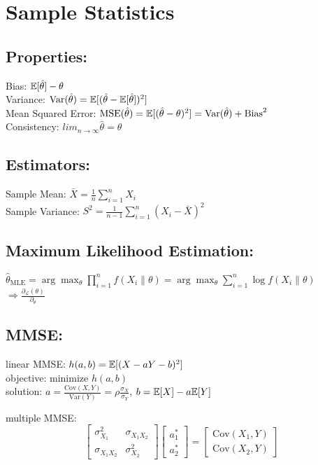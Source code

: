 \section{Sample Statistics}
\subsection{Properties:}
Bias: $\mathbb{E}[\hat{\theta}] - \theta$\\
Variance: $\text{Var}(\hat{\theta}) = \mathbb{E}[(\hat{\theta} - \mathbb{E}[\hat{\theta}])^2]$\\
Mean Squared Error: $\text{MSE}(\hat{\theta}) = \mathbb{E}[(\hat{\theta} - \theta)^2] = 
\text{Var}(\hat{\theta}) + \text{Bias}^2$\\
Consistency: $lim_{n \to \infty} \hat{\theta} = \theta$\\
\subsection{Estimators:}
Sample Mean: $\bar{X} = \frac{1}{n} \sum_{i=1}^{n} X_i$\\
Sample Variance: $S^2 = \frac{1}{n-1} \sum_{i=1}^{n} (X_i - \bar{X})^2$\\
\subsection{Maximum Likelihood Estimation:}
$\hat{\theta}_{\text{MLE}} = \arg \max_{\theta} \prod_{i=1}^{n} f(X_i \| \theta) = \arg \max_{\theta} \sum_{i=1}^{n} \log f(X_i \| \theta)$\\
$\Rightarrow \frac{\partial_{\mathcal{L}}(\theta)}{\partial_\theta}$

\subsection{MMSE:}
linear MMSE: 
$h(a, b) = \mathbb{E}[(X - aY - b)^2]$\\
objective: minimize $h(a, b)$\\
solution: $a = \frac{\text{Cov}(X, Y)}{\text{Var}(Y)} = \rho \frac{\sigma_X}{\sigma_Y}$, $b = \mathbb{E}[X] - a \mathbb{E}[Y]$

multiple MMSE:
\[
\begin{bmatrix}
\sigma_{X_1}^2 & \sigma_{X_1 X_2} \\
\sigma_{X_1 X_2} & \sigma_{X_2}^2
\end{bmatrix}
\begin{bmatrix}
a_1^* \\
a_2^*
\end{bmatrix}
=
\begin{bmatrix}
\mathrm{Cov}(X_1, Y) \\
\mathrm{Cov}(X_2, Y)
\end{bmatrix}
\]

